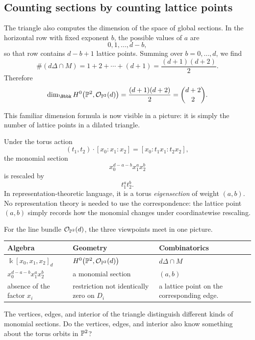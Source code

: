 \subsection{Counting sections by counting lattice points}

The triangle also computes the dimension of the space of global
sections. In the horizontal row with fixed exponent \(b\), the
possible values of \(a\) are
\[
0,1,\ldots,d-b,
\]
so that row contains \(d-b+1\) lattice points. Summing over
\(b=0,\ldots,d\), we find
\[
\#(d\Delta\cap M)
=
1+2+\cdots+(d+1)
=
\frac{(d+1)(d+2)}{2}.
\]
Therefore
\[
\dim_{\Bbbk}
\Hzero{\PP^2}{\cO_{\PP^2}(d)}
=
\frac{(d+1)(d+2)}{2}
=
\binom{d+2}{2}.
\]

This familiar dimension formula is now visible in a picture: it is
simply the number of lattice points in a dilated triangle.

\begin{observation}
Under the torus action
\[
(t_1,t_2)\cdot[x_0:x_1:x_2]
=
[x_0:t_1x_1:t_2x_2],
\]
the monomial section
\[
x_0^{d-a-b}x_1^ax_2^b
\]
is rescaled by
\[
t_1^at_2^b.
\]
In representation-theoretic language, it is a torus
\emph{eigensection} of weight \((a,b)\). No representation theory is
needed to use the correspondence: the lattice point \((a,b)\) simply
records how the monomial changes under coordinatewise rescaling.
\end{observation}

\begin{threedictionaries}
For the line bundle \(\mathcal{O}_{\mathbb{P}^2}(d)\), the three viewpoints meet in
one picture.
\begin{center}
\small
\begin{tabularx}{\linewidth}{
  >{\centering\arraybackslash}X|
  >{\centering\arraybackslash}X|
  >{\centering\arraybackslash}X}
\textbf{Algebra} & \textbf{Geometry} & \textbf{Combinatorics}\\
\hline
\(\Bbbk[x_0,x_1,x_2]_d\) &
\(H^{0}\!\left(\mathbb{P}^2,\mathcal{O}_{\mathbb{P}^2}(d)\right)\) &
\(d\Delta\cap M\)
\\[2mm]
\(x_0^{d-a-b}x_1^ax_2^b\) &
a monomial section &
\((a,b)\)
\\[2mm]
absence of the factor \(x_i\) &
restriction not identically zero on \(D_i\) &
a lattice point on the corresponding edge.
\end{tabularx}
\end{center}
\end{threedictionaries}

\begin{guidingquestion}
The vertices, edges, and interior of the triangle distinguish different
kinds of monomial sections. Do the vertices, edges, and interior also
know something about the torus orbits in \(\mathbb{P}^2\)?
\end{guidingquestion}


